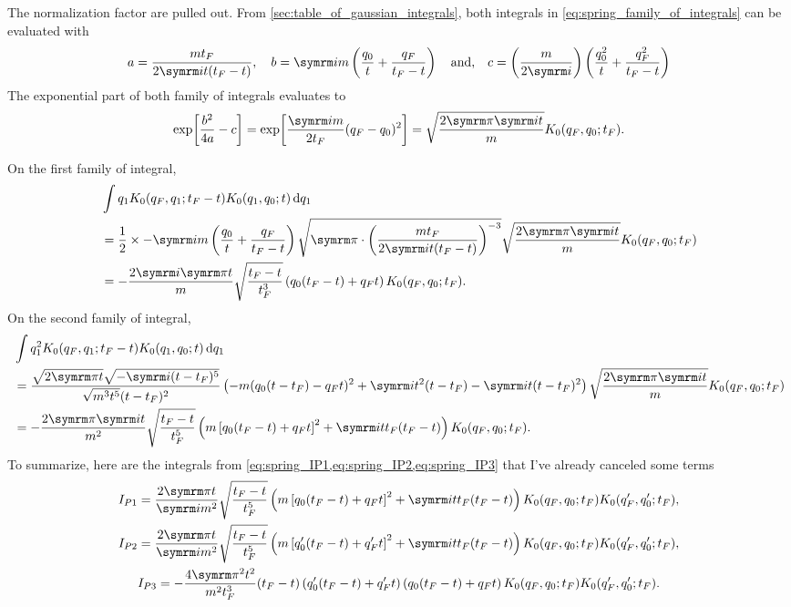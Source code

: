 The normalization factor are pulled out. From \cref{sec:table_of_gaussian_integrals}, both integrals in \cref{eq:spring_family_of_integrals} can be evaluated with
\begin{equation}
    a = \frac{m t_F}{2\im t(t_F - t)}, \quad b = \im m\left(\frac{q_0}{t} + \frac{q_F}{t_F - t}\right) \mathand c = \left(\frac{m}{2\im}\right)\left(\frac{q_0^2}{t} + \frac{q_F^2}{t_F - t}\right)
\end{equation}
The exponential part of both family of integrals evaluates to
\begin{equation}
    \exp[\frac{b^2}{4a} - c] = \exp[\frac{\im m}{2t_F}(q_F - q_0)^2] = \sqrt{\frac{2\cpi\im t}{m}}K_0(q_F, q_0; t_F).
\end{equation}

On the first family of integral,
\begin{align}
    &\int q_1K_0(q_F, q_1; t_F - t)K_0(q_1, q_0; t)\dd{q_1} \\
    &= \frac{1}{2} \times -\im m\left(\frac{q_0}{t} + \frac{q_F}{t_F - t}\right)\sqrt{\cpi \cdot \left(\frac{m t_F}{2\im t(t_F - t)}\right)^{-3}}\sqrt{\frac{2\cpi\im t}{m}}K_0(q_F, q_0; t_F) \\
    &= -\frac{2\im\cpi t}{m}\sqrt{\frac{t_F - t}{t_F^3}}
    \left(q_0(t_F - t) + q_Ft\right)K_0(q_F, q_0; t_F).
\end{align}
On the second family of integral,
\begin{align}
    &\int q_1^2K_0(q_F, q_1; t_F - t)K_0(q_1, q_0; t)\dd{q_1} \\
    &= \frac{\sqrt{2\cpi t}\sqrt{-\im(t - t_F)^5}}{\sqrt{m^3t^5}(t - t_F)^2}\left(-m(q_0(t - t_F) - q_Ft)^2 + \im t^2(t - t_F) - \im t(t - t_F)^2\right)\sqrt{\frac{2\cpi\im t}{m}}K_0(q_F, q_0; t_F) \nonumber\\
    &= -\frac{2\cpi\im t}{m^2}\sqrt{\frac{t_F - t}{t_F^5}}\left(m\left[q_0(t_F - t) + q_Ft\right]^2 + \im tt_F(t_F - t)\right)K_0(q_F, q_0; t_F).
\end{align}
To summarize, here are the integrals from \cref{eq:spring_IP1,eq:spring_IP2,eq:spring_IP3} that I've already canceled some terms
\begin{gather}
    I_{P1} = \frac{2\cpi t}{\im m^2}\sqrt{\frac{t_F - t}{t_F^5}}\left(m\left[q_0(t_F - t) + q_Ft\right]^2 + \im tt_F(t_F - t)\right)K_0(q_F, q_0; t_F)K_0(q_F', q_0'; t_F), \\
    I_{P2} = \frac{2\cpi t}{\im m^2}\sqrt{\frac{t_F - t}{t_F^5}}\left(m\left[q_0'(t_F - t) + q_F't\right]^2 + \im tt_F(t_F - t)\right)K_0(q_F, q_0; t_F)K_0(q_F', q_0'; t_F), \\
    I_{P3} = -\frac{4\cpi^2t^2}{m^2t_F^3}(t_F - t)\left(q_0'(t_F - t) + q_F't\right)\left(q_0(t_F - t) + q_Ft\right)K_0(q_F, q_0; t_F)K_0(q_F', q_0'; t_F).
\end{gather}


